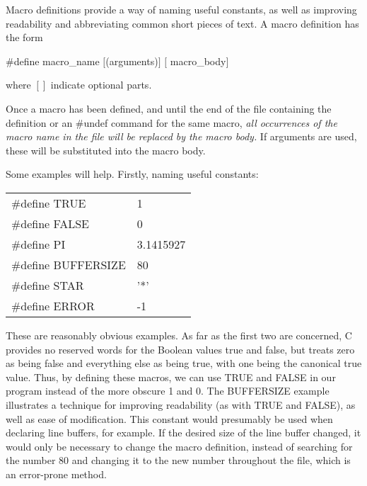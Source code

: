 Macro definitions  provide a  way of  naming useful constants, as well
as improving readability  and abbreviating  common short  pieces of
text. A macro definition has the form 
\begin{display}\cd
\#define {\ms macro\_name\/} $[$({\ms arguments\/})$]$  $[${\ms
macro\_body}$]$
\end{display}
\noindent
where $[]$ indicate optional parts.

Once a macro has been defined, and until the end of the file containing
the definition or  an {\cd \#undef}  command for  the same  macro,
{\em all occurrences of the macro name  in the  file will  be replaced by
the macro body.}  If arguments are used, these will be substituted into
the macro body.

Some examples will help. Firstly, naming useful constants:
\begin{display}\cd   
\begin{tabular}{@{}ll@{}}   
      \#define TRUE   & 1 \\
      \#define FALSE      & 0 \\
      \#define PI         & 3.1415927 \\
      \#define BUFFERSIZE & 80 \\
      \#define STAR       & '*' \\
      \#define ERROR      & -1 
\end{tabular} 
\end{display}
\noindent
These are  reasonably obvious  examples. As  far as  the  first  two 
are concerned, C provides no reserved words for the Boolean
values
true and false, but treats  zero as  being false  and everything else
as being true, with one being the canonical true  value. Thus,
by defining  these macros, we can use {\cd TRUE} and  {\cd FALSE} in
our program  instead of  the more  obscure 1  and  0.  The {\cd
BUFFERSIZE} example  illustrates a technique for improving
readability (as with {\cd TRUE} and  
{\cd FALSE}), as  well  as ease 
of  modification.  This  constant  would presumably be  used when 
declaring line  buffers, for example. If the desired size of  the
line  buffer changed,  it would  only be  necessary to change the
macro definition,  instead of  searching for  the number 80 and
changing it to the new number throughout the file, which is an
error-prone method.


